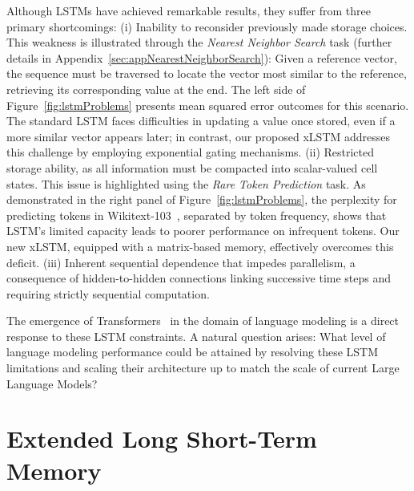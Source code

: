 Although LSTMs have achieved remarkable results, they suffer from three primary shortcomings: (i) Inability to reconsider previously made storage choices. This weakness is illustrated through the {\it Nearest Neighbor Search} task (further details in Appendix~\ref{sec:appNearestNeighborSearch}): Given a reference vector, the sequence must be traversed to locate the vector most similar to the reference, retrieving its corresponding value at the end. The left side of Figure~\ref{fig:lstmProblems} presents mean squared error outcomes for this scenario. The standard LSTM faces difficulties in updating a value once stored, even if a more similar vector appears later; in contrast, our proposed xLSTM addresses this challenge by employing exponential gating mechanisms. (ii) Restricted storage ability, as all information must be compacted into scalar-valued cell states. This issue is highlighted using the {\it Rare Token Prediction} task. As demonstrated in the right panel of Figure~\ref{fig:lstmProblems}, the perplexity for predicting tokens in Wikitext-103~\citep{Merity:17}, separated by token frequency, shows that LSTM’s limited capacity leads to poorer performance on infrequent tokens. Our new xLSTM, equipped with a matrix-based memory, effectively overcomes this deficit. (iii) Inherent sequential dependence that impedes parallelism, a consequence of hidden-to-hidden connections linking successive time steps and requiring strictly sequential computation.

The emergence of Transformers~\citep{Vaswani:17} in the domain of language modeling is a direct response to these LSTM constraints. A natural question arises: What level of language modeling performance could be attained by resolving these LSTM limitations and scaling their architecture up to match the scale of current Large Language Models?

\section{Extended Long Short-Term Memory}
\label{sec:xLSTM}

